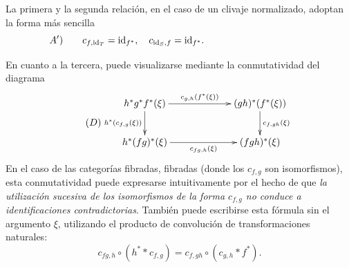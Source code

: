 La primera y la segunda relación, en el caso de un clivaje normalizado,
adoptan la forma más sencilla
\begin{equation*}
\label{eq:VI.7.A'}\quad A')\qquad {c_{f,\mathrm{id}_T}=\mathrm{id}_{f^*},\quad
c_{\mathrm{id}_S,f}=\mathrm{id}_{f^*}.\qquad\qquad\qquad\qquad\qquad\qquad}
\end{equation*}

En cuanto a la tercera, puede visualizarse mediante la conmutatividad del
diagrama
\begin{equation*}
\label{eq:VI.7.D} \tag{$D$}
\begin{split}
\xymatrix@C=2.2cm{
h^*g^*f^*(\xi) \ar[r]^-{c_{g,h}(f^*(\xi))} \ar[d]_{h^*(c_{f,g}(\xi))}
& (gh)^*(f^*(\xi)) \ar[d]^{c_{f,gh}(\xi)} \\
h^*(fg)^*(\xi) \ar[r]_-{c_{fg,h}(\xi)} & (fgh)^*(\xi) }
\end{split}
\end{equation*}
En el caso de las categorías
{fibradas,}
{fibradas}
(donde los $c_{f,g}$ son isomorfismos), esta conmutatividad puede expresarse
intuitivamente por el hecho de que \emph{la utilización sucesiva de los
isomorfismos de la forma $c_{f,g}$ no conduce a \og identificaciones
contradictorias\fg}. También puede escribirse esta fórmula sin el argumento
$\xi$, utilizando el producto de convolución de transformaciones naturales:
$$
c_{fg,h}\circ (h^**c_{f,g})=c_{f,gh}\circ(c_{g,h}*f^*).
$$

